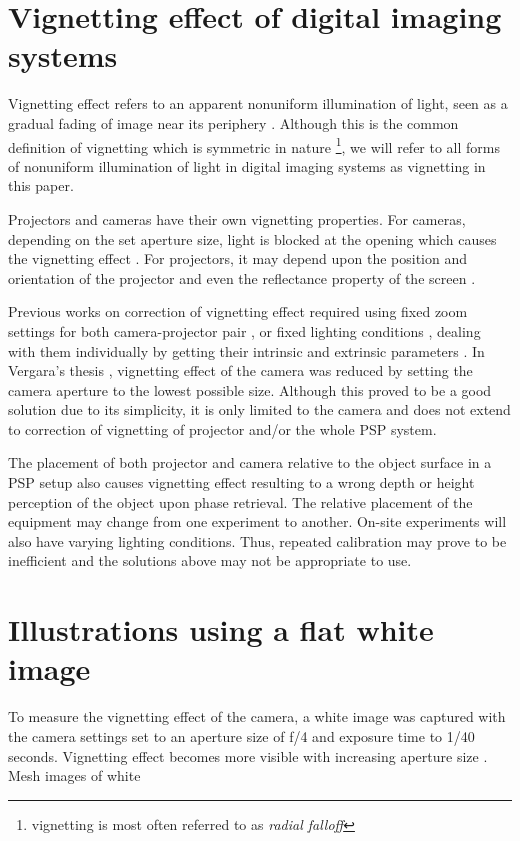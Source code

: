 \section{Vignetting effect of digital imaging systems}

Vignetting effect refers to an apparent nonuniform illumination of light, seen as a gradual fading of image near its periphery \cite{Hecht2007}. 
Although this is the common definition of vignetting which is symmetric in nature \footnote{vignetting is most often referred to as \textit{radial falloff}}, we will refer to all forms of nonuniform illumination of light in digital imaging systems as vignetting in this paper.

Projectors and cameras have their own vignetting properties. 
For cameras, depending on the set aperture size, light is blocked at the opening which causes the vignetting effect \cite{Hecht2007}. 
For projectors, it may depend upon the position and orientation of the projector and even the reflectance property of the screen \cite{Juang2007}. 

Previous works on correction of vignetting effect required using fixed zoom settings for both camera-projector pair \cite{Juang2007}, or fixed lighting conditions \cite{}, dealing with them individually by getting their intrinsic and extrinsic parameters \cite{Goldman2010}. 
In Vergara's thesis \cite{Vergara2010}, vignetting effect of the camera was reduced by setting the camera aperture to the lowest possible size. Although this proved to be a good solution due to its simplicity, it is only limited to the camera and does not extend to correction of vignetting of projector and/or the whole PSP system.

The placement of both projector and camera relative to the object surface in a PSP setup also causes vignetting effect resulting to a wrong depth or height perception of the object upon phase retrieval. The relative placement of the equipment may change from one experiment to another. On-site experiments will also have varying lighting conditions. Thus, repeated calibration may prove to be inefficient and the solutions above may not be appropriate to use. 


\section{Illustrations using a flat white image}
To measure the vignetting effect of the camera, a white image was captured with the camera settings set to an aperture size of f/4 and exposure time to 1/40 seconds. 
Vignetting effect becomes more visible with increasing aperture size \cite{Juang2007}. 
Mesh images of white 

